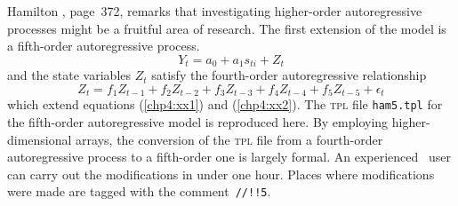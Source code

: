 \documentclass{admbmanual}
\begin{document}
Hamilton \cite{hamilton1989}, page~372, remarks that investigating higher-order
autoregressive processes might be a fruitful area of research.
The first extension of the model is a fifth-order autoregressive process.  
\begin{equation}
{
Y_t=a_0+a_1s_{ti}+Z_t }
\label{chp5:yy1}
\end{equation} 
and the state variables $Z_t$ satisfy the fourth-order 
autoregressive relationship
\begin{equation}
{
Z_t=f_1Z_{t-1}+f_2Z_{t-2}+f_3Z_{t-3}+f_4Z_{t-4}+f_5Z_{t-5}+
  \epsilon_t}
\label{chp5:yy2}
\end{equation} 
which extend equations (\ref{chp4:xx1}) %
and (\ref{chp4:xx2}). %
The \textsc{tpl} file \texttt{ham5.tpl} for the fifth-order autoregressive model
is reproduced here. By employing higher-dimensional arrays, the conversion of
the \textsc{tpl} file from a fourth-order autoregressive 
process to a fifth-order one
is largely formal. An experienced \ADM\ user can carry out the
modifications in under one hour. Places where modifications were made are tagged
with the comment~\texttt{//!!5}.
\end{document}
